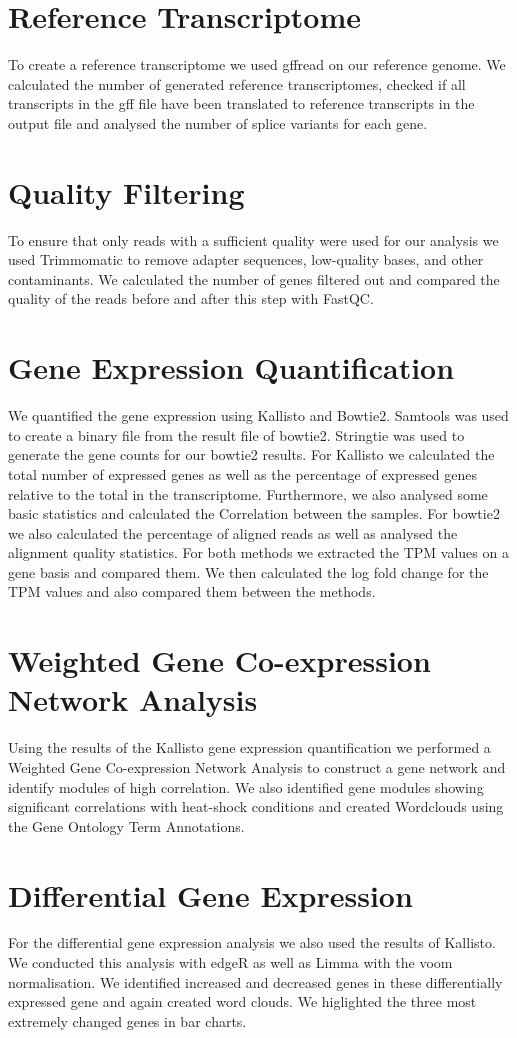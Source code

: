 \section{Reference Transcriptome}
To create a reference transcriptome we used gffread on our reference genome. 
We calculated the number of generated reference
transcriptomes, checked if all transcripts in the gff file have been translated 
to reference transcripts in the output file
and analysed the number of splice variants for each gene.

\section{Quality Filtering}
To ensure that only reads with a sufficient quality were used for our analysis we used Trimmomatic to remove
adapter sequences, low-quality bases, and other contaminants. We calculated the number of genes filtered out
and compared the quality of the reads before and after this step with FastQC.

\section{Gene Expression Quantification}
We quantified the gene expression using Kallisto and Bowtie2.
Samtools was used to create a binary file from the result file of bowtie2. Stringtie was used
to generate the gene counts for our bowtie2 results.
For Kallisto we calculated the total number of expressed genes as well as the percentage of expressed
genes relative to the total in the transcriptome. Furthermore, we also analysed some basic statistics and
calculated the Correlation between the samples.
For bowtie2 we also calculated the percentage of aligned reads as well as analysed the
alignment quality statistics.
For both methods we extracted the TPM values on a gene basis and compared them. 
We then calculated the log fold change for the TPM values and also compared them between the 
methods.

\section{Weighted Gene Co-expression Network Analysis}
Using the results of the Kallisto gene expression quantification we performed a Weighted Gene 
Co-expression Network Analysis to construct a gene network and identify modules of high 
correlation. We also identified gene modules showing significant correlations with
heat-shock conditions and created Wordclouds using the Gene Ontology Term Annotations. 


\section{Differential Gene Expression}
For the differential gene expression analysis we also used the results of Kallisto.
We conducted this analysis with edgeR as well as Limma with the voom normalisation. 
We identified increased and decreased genes in these differentially expressed gene 
and again created word clouds. We higlighted the three most extremely changed genes 
in bar charts. 

